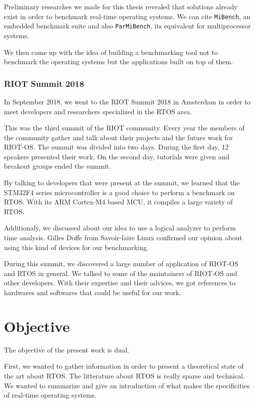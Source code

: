 Preliminary researches we made for this thesis revealed that solutions already exist in order to benchmark real-time operating systems.
We can cite \texttt{MiBench}\cite{mibench}, an embedded benchmark suite and also \texttt{ParMiBench}\cite{parmibench}, its equivalent for multiprocessor systems.

We then came up with the idea of building a benchmarking tool not to benchmark the operating systems but the applications built on top of them.

\subsubsection*{RIOT Summit 2018}
In September 2018, we went to the RIOT Summit 2018 in Amsterdam in order to meet developers and researchers specialized in the RTOS area.

This was the third summit of the RIOT community.
Every year the members of the community gather and talk about their projects and the future work for RIOT-OS.
The summit was divided into two days. 
During the first day, 12 speakers presented their work. 
On the second day, tutorials were given and breakout groups ended the summit.

By talking to developers that were present at the summit, we learned that the STM32F4 series microcontroller is a good choice to perform a benchmark on RTOS. 
With its ARM Cortex-M4 based MCU, it compiles a large variety of RTOS.

Additionaly, we discussed about our idea to use a logical analyzer to perform time analysis. 
Gilles Doffe from Savoir-faire Linux confirmed our opinion about using this kind of devices for our benchmarking.

During this summit, we discovered a large number of application of RIOT-OS and RTOS in general.
We talked to some of the maintainers of RIOT-OS and other developers. 
With their expertise and their advices, we got references to hardwares and softwares that could be useful for our work.

%
%
\section*{Objective}
The objective of the present work is dual.

First, we wanted to gather information in order to present a theoretical state of the art about RTOS.
The litterature about RTOS is really sparse and technical.
We wanted to summarize and give an introduction of what makes the specificities of real-time operating systems.

